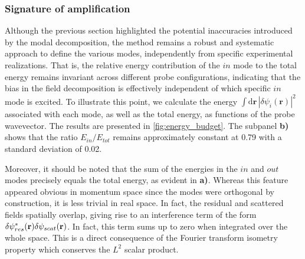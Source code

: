 \subsubsection{Signature of amplification}
Although the previous section highlighted the potential inaccuracies introduced by the modal decomposition, the method remains a robust and systematic approach to define the various modes, independently from specific experimental realizations. That is, the relative energy contribution of the $in$ mode to the total energy remains invariant across different probe configurations, indicating that the bias in the field decomposition is effectively independent of which specific $in$ mode is excited.
To illustrate this point, we calculate the energy \( \int \mathrm{d}\mathbf{r} \, |\delta\psi_i(\mathbf{r})|^2 \) associated with each mode, as well as the total energy, as functions of the probe wavevector. The results are presented in \autoref{fig:energy_budget}. 
The subpanel \textbf{b)} shows that the ratio \( E_{in}/E_{tot} \) remains approximately constant at 0.79 with a standard deviation of 0.02.  


Moreover, it should be noted that the sum of the energies in the \( in \) and \( out \) modes precisely equals the total energy, as evident in \textbf{a)}. Whereas this feature appeared obvious in momentum space since the modes were orthogonal by construction, it is less trivial in real space.
In fact, the residual and scattered fields spatially overlap, giving rise to an interference term of the form $\delta \psi_{res}^*(\mathbf{r}) \delta \psi_{scat}(\mathbf{r})$. In fact, this term sums up to zero when integrated over the whole space.
This is a direct consequence of the Fourier transform isometry property which conserves the $L^2$ scalar product.

\bigskip

